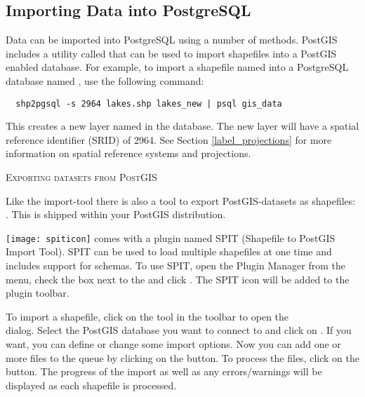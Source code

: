 
\subsection{Importing Data into PostgreSQL}\label{sec:loading_postgis_data}

Data can be imported into PostgreSQL using a number of methods. PostGIS
includes a utility called  that can be used to import shapefiles into
a PostGIS enabled database. For example, to import a shapefile named
into a PostgreSQL database named , use the following command:

\begin{verbatim}
  shp2pgsql -s 2964 lakes.shp lakes_new | psql gis_data
\end{verbatim}

This creates a new layer named  in the
 database. The
new layer will have a spatial reference identifier (SRID) of 2964. See Section
\ref{label_projections} for more information on spatial reference systems and
projections.
\begin{Tip}
\caption{\textsc{Exporting datasets from PostGIS}}
Like the import-tool  there is also a tool to export
PostGIS-datasets as shapefiles: . This is shipped within your
PostGIS distribution.
\end{Tip}

\texttt{[image: spiticon]} \qg comes with a
plugin named
SPIT (Shapefile to PostGIS Import Tool).
SPIT can be used to load multiple shapefiles at one time and includes support
for schemas. To use SPIT, open the Plugin Manager from the 
menu, check the box next to the  and click . The SPIT
icon will be added to the plugin toolbar.

To import a shapefile, click on the  tool in the
toolbar to open the \\
 dialog. Select the PostGIS database
you want to connect to and click on . If you want, you can define or 
change some import options. Now you can add one or more files to the queue by 
clicking on the  button. To process the files, click on the  
button. The progress of the import as well as any errors/warnings will be displayed 
as each shapefile is processed.

